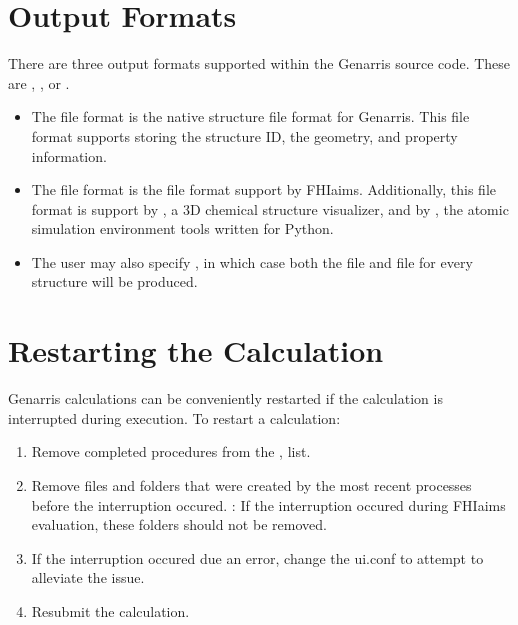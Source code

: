 \documentclass[letterpaper,10pt,english]{sphinxmanual}
\begin{document}
\section{Output Formats}
\label{\detokenize{index:output-formats}}
There are three output formats supported within the Genarris source code. These
are , , or .
\begin{itemize}
\item {} 
The  file format is the native structure file format for Genarris.
This file format supports storing the structure ID, the geometry, and
property information.

\item {} 
The  file format is the file format support by FHI\sphinxhyphen{}aims. Additionally,
this file format is support by  , a 3D chemical structure visualizer,
and by , the atomic simulation environment tools written for Python.

\item {} 
The user may also specify , in which case both the  file
and  file for every structure will be produced.

\end{itemize}


\section{Restarting the Calculation}
\label{\detokenize{index:restarting-the-calculation}}
Genarris calculations can be conveniently restarted if the calculation is
interrupted during execution. To restart a calculation:
\begin{enumerate}
%
\item {} 
Remove completed procedures from the , 
list.

\item {} 
Remove files and folders that were created by the most recent processes
before the interruption occured. : If the interruption occured
during FHI\sphinxhyphen{}aims evaluation, these folders should not be removed.

\item {} 
If the interruption occured due an error, change the
ui.conf to attempt to alleviate the issue.

\item {} 
Resubmit the calculation.

\end{enumerate}
\end{document}
